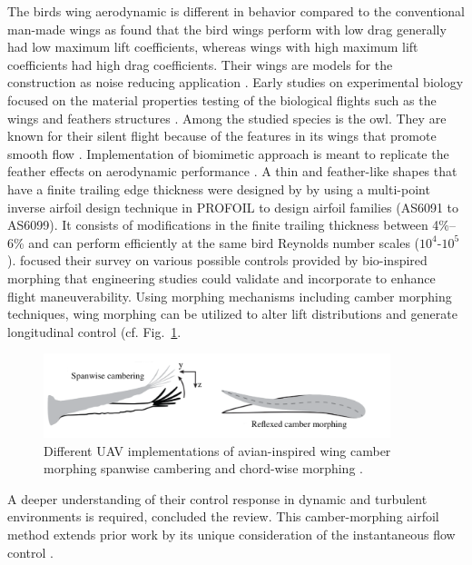 \documentclass[conf]{new-aiaa}
\begin{document}
The birds wing aerodynamic is different in behavior compared to the conventional man-made wings as \citet{withers1981aerodynamic} found that the bird wings perform with low drag generally had low maximum lift coefficients, whereas wings with high maximum lift coefficients had high drag coefficients. 
%
Their wings are models for the construction as noise reducing application \cite{bachmann2010anatomical}.
%
Early studies on experimental biology focused on the material properties testing of the biological flights such as the wings and feathers structures \cite{bachmann2012flexural}.
%
Among the studied species is the owl. They are known for their silent flight because of the features in its wings that promote smooth flow \cite{jaworski2020aeroacoustics,geyer2016silent}.
% 
Implementation of biomimetic approach is meant to replicate the feather effects on aerodynamic performance \cite{hedenstrom2017wind}. 
%
A thin and feather-like shapes that have a finite trailing edge thickness were designed by \citet{ananda2018aerodynamic} by using a multi-point inverse airfoil design technique in PROFOIL \cite{AirfoilDesignSoftwarefortheWeb} to design airfoil families (AS6091 to AS6099).
%
It consists of modifications in the finite trailing thickness between 4\%–6\% and can perform efficiently at the same bird Reynolds number scales ($10^4$-$10^5$).
%
\citet{harvey2022review} focused their survey on various possible controls provided by bio-inspired morphing that engineering studies could validate and incorporate to enhance flight maneuverability.
%
Using morphing mechanisms including camber morphing techniques, wing morphing can be utilized to alter lift distributions and generate longitudinal control (cf. Fig.~\ref{fig:camberMorphing}.
%
\begin{figure}[ht!]
\centering
\includegraphics[width=0.9\textwidth]{figs/morph-crop.pdf}
\caption{Different UAV implementations of avian-inspired wing camber morphing spanwise cambering and chord-wise morphing \cite{harvey2022review}.}
\label{fig:camberMorphing} 
\end{figure}
%
A deeper understanding of their control response in dynamic and turbulent environments is required, concluded the review.
%
This camber-morphing airfoil method extends prior work by its unique consideration of the instantaneous flow control \cite{gamble2020aeroelastic,gamble2020load}.
\end{document}
